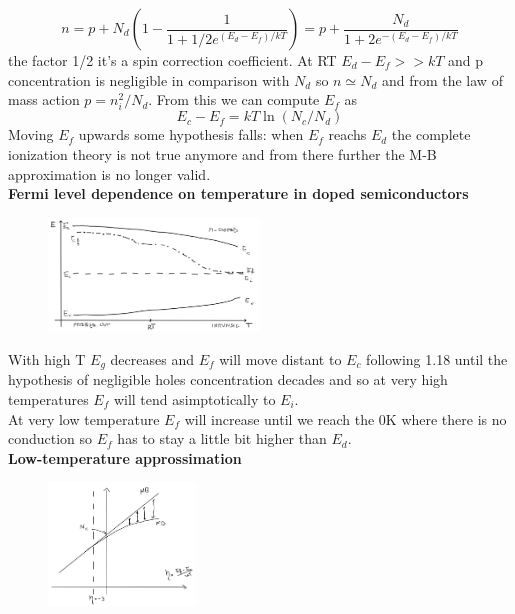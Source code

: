 \begin{equation}
n=p+N_d(1-\frac{1}{1+1/2 e^{(E_d-E_f)/kT}})=p+\frac{N_d}{1+2e^{-(E_d-E_f)/kT}}
\end{equation}
the factor 1/2 it's a spin correction coefficient. At RT $E_d-E_f>>kT$ and p concentration is negligible in comparison with $N_d$ so $n\simeq N_d$ and from the law of mass action $p=n_i^2/N_d$. From this we can compute $E_f$ as 
\begin{equation}
E_c-E_f=kT\ln (N_c/N_d)
\end{equation}
Moving $E_f$ upwards some hypothesis falls: when $E_f$ reachs $E_d$ the complete ionization theory is not true anymore and from there further the M-B approximation is no longer valid.\\
\newline
{\bf Fermi level dependence on temperature in doped semiconductors}\\ 

\begin{figure}
\includegraphics[width=0.5\textwidth]{E_f(T).png}
\end{figure}

With high T $E_g$ decreases and $E_f$ will move distant to $E_c$ following 1.18 until the hypothesis of negligible holes concentration decades and so at very high temperatures $E_f$ will tend asimptotically to $E_i$.\\
At very low temperature $E_f$ will increase until we reach the 0K where there is no conduction so $E_f$ has to stay a little bit higher than $E_d$.\\


{\bf Low-temperature approssimation}\\

\begin{figure}
\includegraphics[width=0.35\textwidth]{mbfd.png}
\end{figure}

